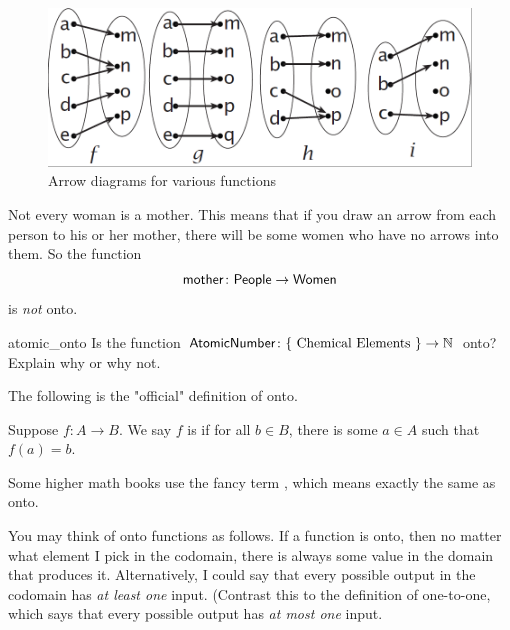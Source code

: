 \begin{center}
\begin{figure}[h]
\includegraphics[scale=0.6]{images/arrowonto.png}
\caption{Arrow diagrams for various functions}
\label{arrowontofig}
\end{figure}
\end{center}


\begin{example}{}
 Not every woman is a mother. 
This means that if you draw an arrow from each person to his or her mother, there will be some women who have no arrows into them. So the function 
\[ \sf{mother} \colon \sf{People} \to \sf{Women} \]
 is \emph{not} onto.
\end{example}

\begin{exercise}{atomic_onto}
Is the function $\sf{Atomic Number} \colon \{ \mbox{ Chemical Elements } \} \to \mathbb{N}$ onto?  Explain why or why not.
\end{exercise}

The following is the "official" definition  of onto.

\begin{defn}\label{ontoDef}
Suppose $f \colon A \to B$. We say $f$ is  if for all $b \in B$, 
there is some $a \in A$  such that $f(a) = b$. 
\end{defn}

Some higher math books use the fancy term , which means exactly the same as onto.

You may think of onto functions as follows. If a function is onto, then no matter what element I pick in the codomain, there is always some value in the domain that produces it. 
Alternatively, I could say that every possible output in the codomain has \emph{at least one} input.  (Contrast this to the definition of one-to-one, which says that every possible output has \emph{at most one} input.

